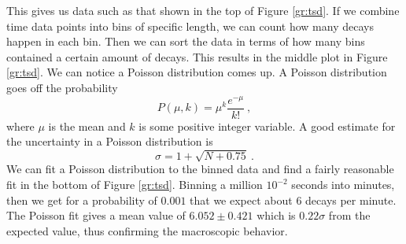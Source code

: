 \documentclass[aps,prl,twocolumn,superscriptaddress]{revtex4-1}
\begin{document}
This gives us data such as that shown in the top of Figure \ref{gr:tsd}. If we combine time data points into bins of specific length, we can count how many decays happen in each bin. Then we can sort the data in terms of how many bins contained a certain amount of decays. This results in the middle plot in Figure \ref{gr:tsd}. We can notice a Poisson distribution comes up. A Poisson distribution goes off the probability
\begin{equation}
P(\mu, k) = \mu^k \frac{e^{-\mu}}{k!}~, \label{eqn:pois}
\end{equation}
where $\mu$ is the mean and $k$ is some positive integer variable. A good estimate for the uncertainty in a Poisson distribution is
\begin{equation}
\sigma = 1 + \sqrt{N + 0.75} ~. \label{eqn:poisunc}
\end{equation}
We can fit a Poisson distribution to the binned data and find a fairly reasonable fit in the bottom of Figure \ref{gr:tsd}. Binning a million $10^{-2}$ seconds into minutes, then we get for a probability of $0.001$ that we expect about $6$ decays per minute. The Poisson fit gives a mean value of $6.052 \pm 0.421$ which is $0.22\sigma$ from the expected value, thus confirming the macroscopic behavior.
\end{document}
